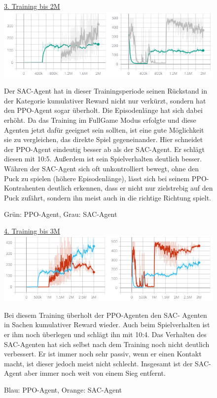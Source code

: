 \begin{figure} [h]
\underline{3. Training bis 2M} \\
\includegraphics[width=\textwidth]{images/fullgame_erg}
\caption{Grün: PPO-Agent, Grau: SAC-Agent}
Der SAC-Agent hat in dieser Trainingsperiode seinen Rückstand in der Kategorie kumulativer Reward nicht nur verkürzt, sondern hat den PPO-Agent sogar überholt. Die Episodenlänge hat sich dabei erhöht. Da das Training im FullGame Modus erfolgte und diese Agenten jetzt dafür geeignet sein sollten, ist eine gute Möglichkeit sie zu vergleichen, das direkte Spiel gegeneinander. Hier schneidet der PPO-Agent eindeutig besser ab als der SAC-Agent. Er schlägt diesen mit 10:5. Außerdem ist sein Spielverhalten deutlich besser. Währen der SAC-Agent sich oft unkontrolliert bewegt, ohne den Puck zu spielen (höhere Episodenlänge), lässt sich bei seinem PPO-Kontrahenten deutlich erkennen, dass er nicht nur zielstrebig auf den Puck zufährt, sondern ihn meist auch in die richtige Richtung spielt.
\end{figure}

\begin{figure} [h]
\underline{4. Training bis 3M} \\
\includegraphics[width=\textwidth]{images/centered_erg}
\caption{Blau: PPO-Agent, Orange: SAC-Agent}
Bei diesem Training überholt der PPO-Agenten den SAC- Agenten in Sachen kumulativer Reward wieder. Auch beim Spielverhalten ist er ihm noch überlegen und schlägt ihn mit 10:4. Das Verhalten des SAC-Agenten hat sich selbst nach dem Training noch nicht deutlich verbessert. Er ist immer noch sehr passiv, wenn er einen Kontakt macht, ist dieser jedoch meist nicht schlecht. Insgesamt ist der SAC-Agent aber immer noch weit von einem Sieg entfernt.
\end{figure}

